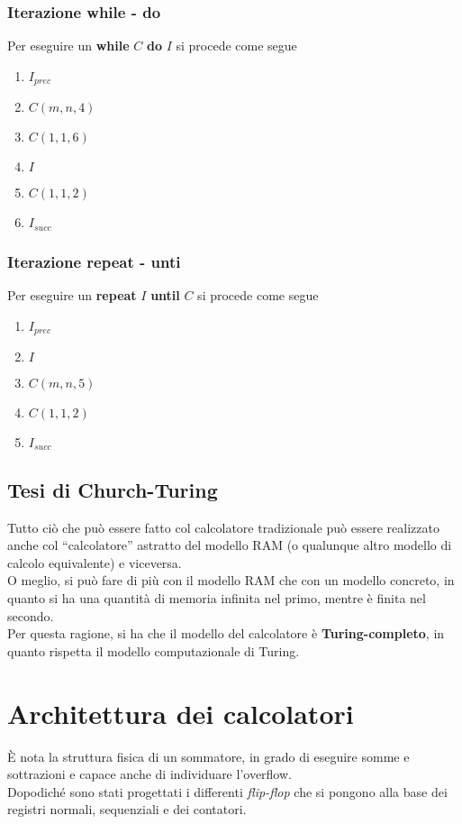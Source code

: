 \documentclass[a4paper]{extarticle}
\newcommand{\quotes}[1]{``#1''}
\begin{document}
\vspace{1em}
\subsubsection{Iterazione while - do}
Per eseguire un \textbf{while} \(C\) \textbf{do} \(I\) si procede come segue
\begin{enumerate}
    \item \(I_{\textit{prec}}\)
    \item \(C(m, n, 4)\)
    \item \(C(1, 1, 6)\)
    \item \(I\)
    \item \(C(1, 1, 2)\)
    \item \(I_{\textit{succ}}\)
\end{enumerate}

\vspace{1em}
\subsubsection{Iterazione repeat - unti}
Per eseguire un \textbf{repeat} \(I\) \textbf{until} \(C\) si procede come segue
\begin{enumerate}
    \item \(I_{\textit{prec}}\)
    \item \(I\)
    \item \(C(m, n, 5)\)
    \item \(C(1, 1, 2)\)
    \item \(I_{\textit{succ}}\)
\end{enumerate}

\subsection{Tesi di Church-Turing}
Tutto ciò che può essere fatto col calcolatore tradizionale può essere realizzato anche col \quotes{calcolatore} astratto del modello RAM (o qualunque altro modello di calcolo equivalente) e viceversa.\\
O meglio, si può fare di più con il modello RAM che con un modello concreto, in quanto si ha una quantità di memoria infinita nel primo, mentre è finita nel secondo.\\
Per questa ragione, si ha che il modello del calcolatore è \textbf{Turing-completo}, in quanto rispetta il modello computazionale di Turing.

\newpage
\section{Architettura dei calcolatori}
È nota la struttura fisica di un sommatore, in grado di eseguire somme e sottrazioni e capace anche di individuare l'overflow.\\
Dopodiché sono stati progettati i differenti \textit{flip-flop} che si pongono alla base dei registri normali, sequenziali e dei contatori.
\end{document}
